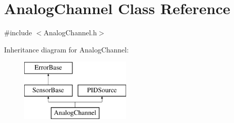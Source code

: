 \hypertarget{classAnalogChannel}{\section{\-Analog\-Channel \-Class \-Reference}
\label{classAnalogChannel}
}


{\ttfamily \#include $<$\-Analog\-Channel.\-h$>$}

\-Inheritance diagram for \-Analog\-Channel\-:\begin{figure}[H]
\begin{center}
\leavevmode
\includegraphics[height=3.000000cm]{classAnalogChannel}
\end{center}
\end{figure}
